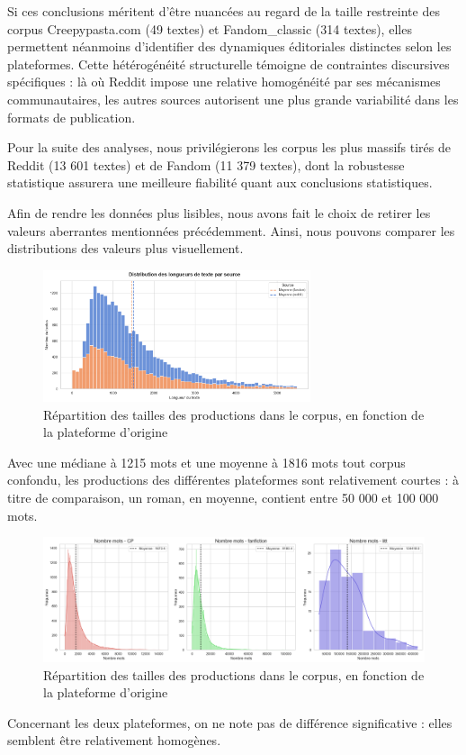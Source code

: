 \documentclass[12pt,a4paper,oneside,titlepage]{book} %
\begin{document}
Si ces conclusions méritent d'être nuancées au regard de la taille restreinte des corpus Creepypasta.com (49 textes) et Fandom\_classic (314 textes), elles permettent néanmoins d'identifier des dynamiques éditoriales distinctes selon les plateformes. Cette hétérogénéité structurelle témoigne de contraintes discursives spécifiques : là où Reddit impose une relative homogénéité par ses mécanismes communautaires, les autres sources autorisent une plus grande variabilité dans les formats de publication.

Pour la suite des analyses, nous privilégierons les corpus les plus massifs tirés de Reddit (13 601 textes) et de Fandom (11 379 textes), dont la robustesse statistique assurera une meilleure fiabilité quant aux conclusions statistiques.


Afin de rendre les données plus lisibles, nous avons fait le choix de retirer les valeurs aberrantes mentionnées précédemment. Ainsi, nous pouvons comparer les distributions des valeurs plus visuellement.
    
    	\begin{figure}[htbp]
		\centering
		\includegraphics[width = 0.7\textwidth]{illustration/hist_nombre_mots_cp.png}
        
		\caption{Répartition des tailles des productions dans le corpus, en fonction de la plateforme d'origine}
	\end{figure}

	Avec une médiane à 1215 mots et une moyenne à 1816 mots tout corpus confondu, les productions des différentes plateformes sont relativement courtes : à titre de comparaison, un roman, en moyenne, contient entre 50 000 et 100 000 mots.

        	\begin{figure}[htbp]
		\centering
		\includegraphics[width = \textwidth]{illustration/nombre_mot_comparaison_sans_abberantes.png}
        
		\caption{Répartition des tailles des productions dans le corpus, en fonction de la plateforme d'origine}
	\end{figure}
	Concernant les deux plateformes, on ne note pas de différence significative : elles semblent être relativement homogènes. 
\end{document}
